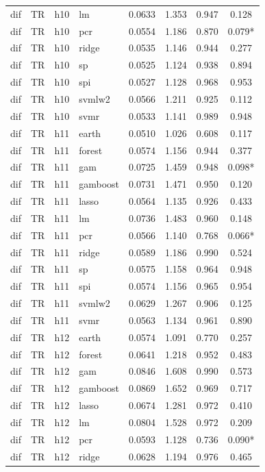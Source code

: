 \begin{ThreePartTable}
\begin{longtable}[t]{llclcccc}
dif & TR & h10 & lm & 0.0633 & 1.353 & 0.947 & 0.128\\
dif & TR & h10 & pcr & 0.0554 & 1.186 & 0.870 & 0.079*\\
dif & TR & h10 & ridge & 0.0535 & 1.146 & 0.944 & 0.277\\
dif & TR & h10 & sp & 0.0525 & 1.124 & 0.938 & 0.894\\
dif & TR & h10 & spi & 0.0527 & 1.128 & 0.968 & 0.953\\
dif & TR & h10 & svmlw2 & 0.0566 & 1.211 & 0.925 & 0.112\\
dif & TR & h10 & svmr & 0.0533 & 1.141 & 0.989 & 0.948\\
\addlinespace
dif & TR & h11 & earth & 0.0510 & 1.026 & 0.608 & 0.117\\
dif & TR & h11 & forest & 0.0574 & 1.156 & 0.944 & 0.377\\
dif & TR & h11 & gam & 0.0725 & 1.459 & 0.948 & 0.098*\\
dif & TR & h11 & gamboost & 0.0731 & 1.471 & 0.950 & 0.120\\
dif & TR & h11 & lasso & 0.0564 & 1.135 & 0.926 & 0.433\\
dif & TR & h11 & lm & 0.0736 & 1.483 & 0.960 & 0.148\\
dif & TR & h11 & pcr & 0.0566 & 1.140 & 0.768 & 0.066*\\
dif & TR & h11 & ridge & 0.0589 & 1.186 & 0.990 & 0.524\\
dif & TR & h11 & sp & 0.0575 & 1.158 & 0.964 & 0.948\\
dif & TR & h11 & spi & 0.0574 & 1.156 & 0.965 & 0.954\\
dif & TR & h11 & svmlw2 & 0.0629 & 1.267 & 0.906 & 0.125\\
dif & TR & h11 & svmr & 0.0563 & 1.134 & 0.961 & 0.890\\
\addlinespace
dif & TR & h12 & earth & 0.0574 & 1.091 & 0.770 & 0.257\\
dif & TR & h12 & forest & 0.0641 & 1.218 & 0.952 & 0.483\\
dif & TR & h12 & gam & 0.0846 & 1.608 & 0.990 & 0.573\\
dif & TR & h12 & gamboost & 0.0869 & 1.652 & 0.969 & 0.717\\
dif & TR & h12 & lasso & 0.0674 & 1.281 & 0.972 & 0.410\\
dif & TR & h12 & lm & 0.0804 & 1.528 & 0.972 & 0.209\\
dif & TR & h12 & pcr & 0.0593 & 1.128 & 0.736 & 0.090*\\
dif & TR & h12 & ridge & 0.0628 & 1.194 & 0.976 & 0.465\\

\end{longtable}
\end{ThreePartTable}
